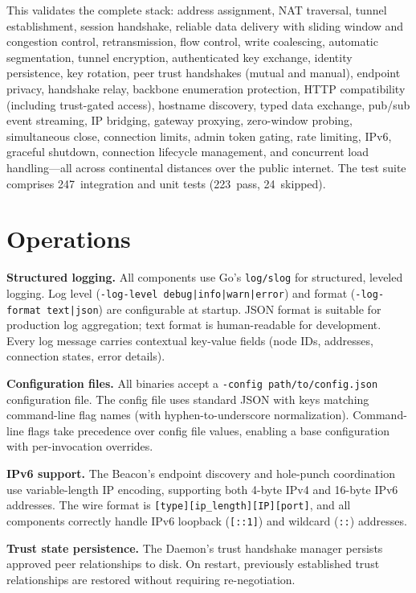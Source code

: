 \documentclass[11pt,a4paper]{article}
\begin{document}
This validates the complete stack: address assignment, NAT traversal, tunnel establishment, session handshake, reliable data delivery with sliding window and congestion control, retransmission, flow control, write coalescing, automatic segmentation, tunnel encryption, authenticated key exchange, identity persistence, key rotation, peer trust handshakes (mutual and manual), endpoint privacy, handshake relay, backbone enumeration protection, HTTP compatibility (including trust-gated access), hostname discovery, typed data exchange, pub/sub event streaming, IP bridging, gateway proxying, zero-window probing, simultaneous close, connection limits, admin token gating, rate limiting, IPv6, graceful shutdown, connection lifecycle management, and concurrent load handling---all across continental distances over the public internet. The test suite comprises 247~integration and unit tests (223~pass, 24~skipped).

\section{Operations}

\textbf{Structured logging.} All components use Go's \texttt{log/slog} for structured, leveled logging. Log level (\texttt{-log-level debug|info|warn|error}) and format (\texttt{-log-format text|json}) are configurable at startup. JSON format is suitable for production log aggregation; text format is human-readable for development. Every log message carries contextual key-value fields (node IDs, addresses, connection states, error details).

\textbf{Configuration files.} All binaries accept a \texttt{-config path/to/config.json} configuration file. The config file uses standard JSON with keys matching command-line flag names (with hyphen-to-underscore normalization). Command-line flags take precedence over config file values, enabling a base configuration with per-invocation overrides.

\textbf{IPv6 support.} The Beacon's endpoint discovery and hole-punch coordination use variable-length IP encoding, supporting both 4-byte IPv4 and 16-byte IPv6 addresses. The wire format is \texttt{[type][ip\_length][IP][port]}, and all components correctly handle IPv6 loopback (\texttt{[::1]}) and wildcard (\texttt{::}) addresses.

\textbf{Trust state persistence.} The Daemon's trust handshake manager persists approved peer relationships to disk. On restart, previously established trust relationships are restored without requiring re-negotiation.
\end{document}
